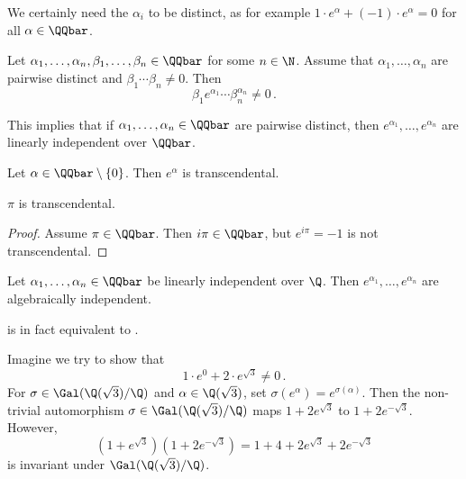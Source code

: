 We certainly need the \( \alpha_i \) to be distinct, as for example \( 1 \cdot e^\alpha + (-1) \cdot e^\alpha = 0 \) for all \( \alpha \in \QQbar \).

\begin{thmn}\label{thm:4.15} 
	Let \( \alpha_1, \dotsc, \alpha_n, \beta_1, \dotsc, \beta_n \in \QQbar \) for some \( n \in \N \).
	Assume that \( \alpha_1, \dotsc, \alpha_n \) are pairwise distinct and \( \beta_1 \dotsm \beta_n \neq 0 \).
	Then
	\[ \beta_1 e^{\alpha_1} \dotsm \beta_n^{\alpha_n} \neq 0 \,. \]
\end{thmn}

\begin{rem*}
	This implies that if \( \alpha_1, \dotsc, \alpha_n \in \QQbar \) are pairwise distinct, then \( e^{\alpha_1}, \dotsc, e^{\alpha_n} \) are linearly independent over \( \QQbar \).
\end{rem*}

\begin{cor}
	Let \( \alpha \in \QQbar \setminus \{0\} \).
	Then \( e^\alpha \) is transcendental.
\end{cor}

\begin{cor}
	\( \pi \) is transcendental.
\end{cor}

\begin{proof}
	Assume \( \pi \in \QQbar \).
	Then \( i \pi \in \QQbar \), but \( e^{i\pi} = -1 \) is not transcendental.
\end{proof}

\begin{cor}\label{thm:4.18}
	Let \( \alpha_1, \dotsc, \alpha_n \in \QQbar \) be linearly independent over \( \Q \).
	Then \( e^{\alpha_1}, \dotsc, e^{\alpha_n} \) are algebraically independent.
\end{cor}

\begin{rem*}
	 is in fact equivalent to .
\end{rem*}

\begin{exmp*}
	Imagine we try to show that
	\[ 1 \cdot e^0 + 2 \cdot e^{\sqrt{3}} \neq 0 \,. \]
	For \( \sigma \in \Gal(\Q(\sqrt{3})/\Q) \) and \( \alpha \in \Q(\sqrt{3}) \), set \( \sigma(e^\alpha) = e^{\sigma(\alpha)} \).
	Then the non-trivial automorphism \( \sigma \in \Gal(\Q(\sqrt{3})/\Q) \) maps \( 1+2e^{\sqrt{3}} \) to \( 1+2e^{-\sqrt{3}} \).
	However,
	\[ \left( 1 + e^{\sqrt{3}} \right) \left( 1 + 2e^{-\sqrt{3}} \right) = 1+4 + 2e^{\sqrt{3}} + 2e^{-\sqrt{3}} \]
	is invariant under \( \Gal(\Q(\sqrt{3})/\Q) \).
\end{exmp*}

